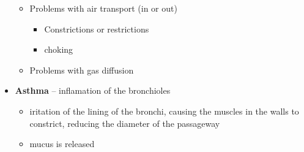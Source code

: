 \documentclass{article}
\theoremstyle{definition}
\begin{document}
\begin{itemize}
\begin{itemize}
			\item Problems with air transport (in or out)
				\begin{itemize}
					\item Constrictions or restrictions
					\item choking
				\end{itemize}
			\item Problems with gas diffusion
		\end{itemize}
	\item \textbf{Asthma}  -- inflamation of the bronchioles
		\begin{itemize}
			\item iritation of the lining of the bronchi, causing the muscles in the walls to constrict, reducing the diameter of the passageway
			\item mucus is released
		\end{itemize}
\end{itemize}
\end{document}
